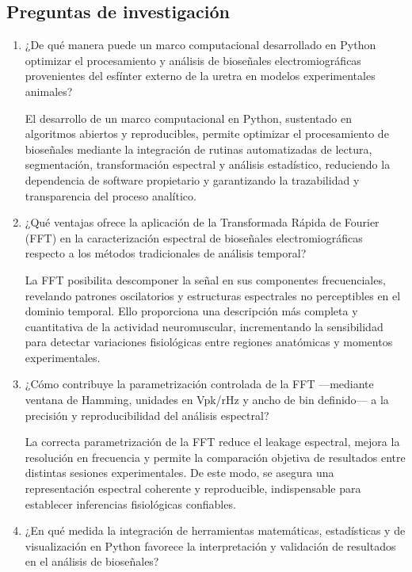 \subsection{Preguntas de investigación}

\begin{enumerate}
	\item ¿De qué manera puede un marco computacional desarrollado en Python optimizar el procesamiento y análisis de bioseñales electromiográficas provenientes del esfínter externo de la uretra en modelos experimentales animales?
	
	El desarrollo de un marco computacional en Python, sustentado en algoritmos abiertos y reproducibles, permite optimizar el procesamiento de bioseñales mediante la integración de rutinas automatizadas de lectura, segmentación, transformación espectral y análisis estadístico, reduciendo la dependencia de software propietario y garantizando la trazabilidad y transparencia del proceso analítico.
	
	\item ¿Qué ventajas ofrece la aplicación de la Transformada Rápida de Fourier (FFT) en la caracterización espectral de bioseñales electromiográficas respecto a los métodos tradicionales de análisis temporal?
	
	La FFT posibilita descomponer la señal en sus componentes frecuenciales, revelando patrones oscilatorios y estructuras espectrales no perceptibles en el dominio temporal. Ello proporciona una descripción más completa y cuantitativa de la actividad neuromuscular, incrementando la sensibilidad para detectar variaciones fisiológicas entre regiones anatómicas y momentos experimentales.
	
	\item ¿Cómo contribuye la parametrización controlada de la FFT —mediante ventana de Hamming, unidades en Vpk/rHz y ancho de bin definido— a la precisión y reproducibilidad del análisis espectral?
	
	La correcta parametrización de la FFT reduce el leakage espectral, mejora la resolución en frecuencia y permite la comparación objetiva de resultados entre distintas sesiones experimentales. De este modo, se asegura una representación espectral coherente y reproducible, indispensable para establecer inferencias fisiológicas confiables.
	
	\item ¿En qué medida la integración de herramientas matemáticas, estadísticas y de visualización en Python favorece la interpretación y validación de resultados en el análisis de bioseñales?
	

\end{enumerate}
